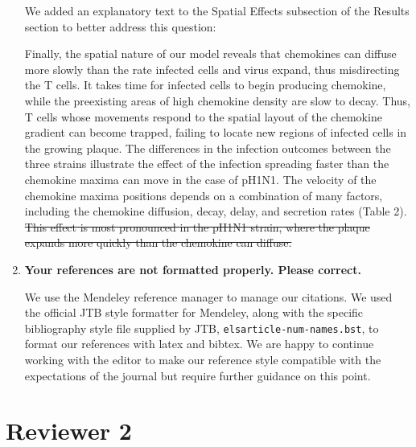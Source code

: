 \documentclass[10pt]{article}
\newcommand{\removed}[1]{{\color{dkred}\sout{#1}}}
\newcommand{\new}[1]{{\color{dkgreen}#1}}
\newenvironment{response}{\fontfamily{cms}\selectfont\small}{\par}
\begin{document}
\begin{enumerate}
\begin{response}
We added an explanatory text to the Spatial Effects subsection of the Results section to better address this question:

\begin{displayquote}
Finally, the spatial nature of our model reveals that chemokines can diffuse more slowly than the rate infected cells and virus expand, thus misdirecting the T cells.  It takes time for infected cells to begin producing chemokine, while the preexisting areas of high chemokine density are slow to decay.  Thus, T cells whose movements respond to the spatial layout of the chemokine gradient can become trapped, failing to locate new regions of infected cells in the growing plaque.  \new{The differences in the infection outcomes between the three strains illustrate the effect of the infection spreading faster than the chemokine maxima can move in the case of pH1N1.  The velocity of the chemokine maxima positions depends on a combination of many factors, including the chemokine diffusion, decay, delay, and secretion rates (Table 2).}
\removed{This effect is most pronounced in the pH1N1 strain, where the plaque expands more quickly than the chemokine can diffuse.}
\end{displayquote}
\end{response}

\item \textbf{Your references are not formatted properly. Please correct.}

\begin{response}
We use the Mendeley reference manager to manage our citations.  We used the official JTB style formatter for Mendeley, along with the specific bibliography style file supplied by JTB, \texttt{elsarticle-num-names.bst}, to format our references with latex and bibtex.  We are happy to continue working with the editor to make our reference style compatible with the expectations of the journal but require further guidance on this point.
\end{response}

\end{enumerate}

\section*{Reviewer 2}
\end{document}
